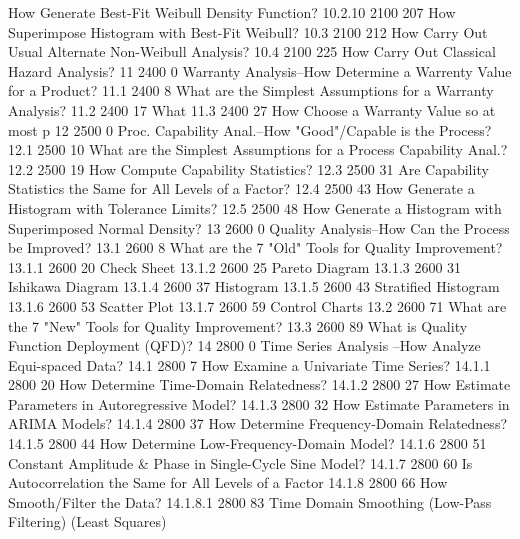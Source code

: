 How Generate Best-Fit Weibull Density Function?
10.2.10         2100       207
How Superimpose Histogram with Best-Fit Weibull?
10.3            2100       212
How Carry Out Usual Alternate Non-Weibull Analysis?
10.4            2100       225
How Carry Out Classical Hazard Analysis?
11              2400         0
Warranty Analysis--How Determine a Warrenty Value for a Product?
11.1            2400         8
What are the Simplest Assumptions for a Warranty Analysis?
11.2            2400        17
What %
11.3            2400        27
How Choose a Warranty Value so at most p%
12              2500         0
Proc. Capability Anal.--How "Good"/Capable is the Process?
12.1            2500        10
What are the Simplest Assumptions for a Process Capability Anal.?
12.2            2500        19
How Compute Capability Statistics?
12.3            2500        31
Are Capability Statistics the Same for All Levels of a Factor?
12.4            2500        43
How Generate a Histogram with Tolerance Limits?
12.5            2500        48
How Generate a Histogram with Superimposed Normal Density?
13              2600         0
Quality Analysis--How Can the Process be Improved?
13.1            2600         8
What are the 7 "Old" Tools for Quality Improvement?
13.1.1          2600        20
Check Sheet
13.1.2          2600        25
Pareto Diagram
13.1.3          2600        31
Ishikawa Diagram
13.1.4          2600        37
Histogram
13.1.5          2600        43
Stratified Histogram
13.1.6          2600        53
Scatter Plot
13.1.7          2600        59
Control Charts
13.2            2600        71
What are the 7 "New" Tools for Quality Improvement?
13.3            2600        89
What is Quality Function Deployment (QFD)?
14              2800         0
Time Series Analysis  --How Analyze Equi-spaced Data?
14.1            2800         7
How Examine a Univariate Time Series?
14.1.1          2800        20
How Determine Time-Domain Relatedness?
14.1.2          2800        27
How Estimate Parameters in Autoregressive Model?
14.1.3          2800        32
How Estimate Parameters in ARIMA Models?
14.1.4          2800        37
How Determine Frequency-Domain Relatedness?
14.1.5          2800        44
How Determine Low-Frequency-Domain Model?
14.1.6          2800        51
Constant Amplitude & Phase in Single-Cycle Sine Model?
14.1.7          2800        60
Is Autocorrelation the Same for All Levels of a Factor
14.1.8          2800        66
How Smooth/Filter the Data?
14.1.8.1        2800        83
Time Domain Smoothing (Low-Pass Filtering) (Least Squares)
